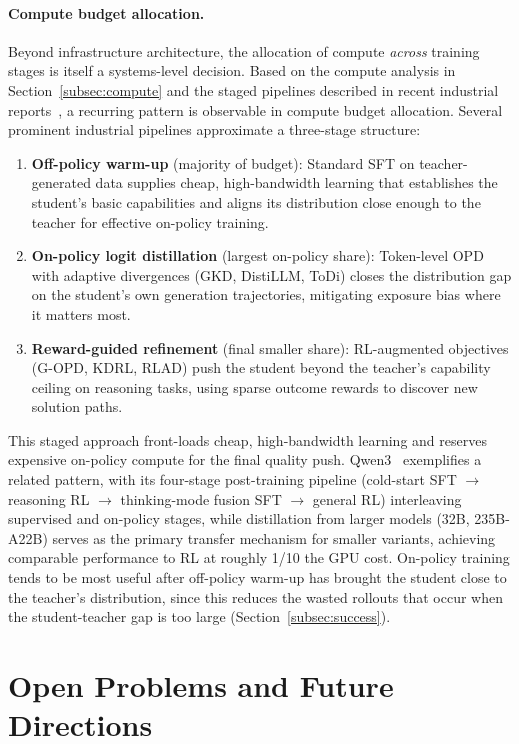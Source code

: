 \documentclass{article} %
\begin{document}
\paragraph{Compute budget allocation.}
\label{subsec:budget}
Beyond infrastructure architecture, the allocation of compute \emph{across} training stages is itself a systems-level decision. Based on the compute analysis in Section~\ref{subsec:compute} and the staged pipelines described in recent industrial reports~\citep{2501.12948,2505.09388}, a recurring pattern is observable in compute budget allocation. Several prominent industrial pipelines approximate a three-stage structure:
\begin{enumerate}
    \item \textbf{Off-policy warm-up} (majority of budget): Standard SFT on teacher-generated data supplies cheap, high-bandwidth learning that establishes the student's basic capabilities and aligns its distribution close enough to the teacher for effective on-policy training.
    \item \textbf{On-policy logit distillation} (largest on-policy share): Token-level OPD with adaptive divergences (GKD, DistiLLM, ToDi) closes the distribution gap on the student's own generation trajectories, mitigating exposure bias where it matters most.
    \item \textbf{Reward-guided refinement} (final smaller share): RL-augmented objectives (G-OPD, KDRL, RLAD) push the student beyond the teacher's capability ceiling on reasoning tasks, using sparse outcome rewards to discover new solution paths.
\end{enumerate}
This staged approach front-loads cheap, high-bandwidth learning and reserves expensive on-policy compute for the final quality push. Qwen3~\citep{2505.09388} exemplifies a related pattern, with its four-stage post-training pipeline (cold-start SFT $\to$ reasoning RL $\to$ thinking-mode fusion SFT $\to$ general RL) interleaving supervised and on-policy stages, while distillation from larger models (32B, 235B-A22B) serves as the primary transfer mechanism for smaller variants, achieving comparable performance to RL at roughly 1/10 the GPU cost. On-policy training tends to be most useful after off-policy warm-up has brought the student close to the teacher's distribution, since this reduces the wasted rollouts that occur when the student-teacher gap is too large (Section~\ref{subsec:success}).

\section{Open Problems and Future Directions}
\label{sec:future}
\end{document}
